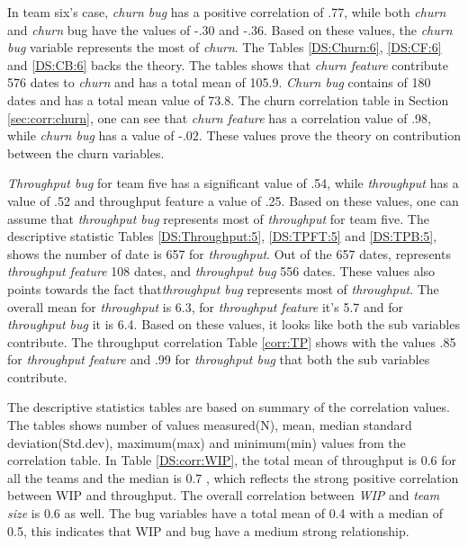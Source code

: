 \documentclass[UKenglish]{ifimaster}  %
\begin{document}
In team six's case, \textit{churn bug} has a positive correlation of .77, while both \textit{churn} and \textit{churn} bug have the values of -.30 and -.36. Based on these values, the \textit{churn bug} variable represents the most of \textit{churn}. The Tables \ref{DS:Churn:6}, \ref{DS:CF:6} and \ref{DS:CB:6} backs the theory. The tables shows that \textit{churn feature} contribute 576 dates to \textit{churn} and has a total mean of 105.9. \textit{Churn bug} contains of 180 dates and has a total mean value of 73.8. The churn correlation table in Section \ref{sec:corr:churn}, one can see that \textit{churn feature} has a correlation value of .98, while \textit{churn bug} has a value of -.02. These values prove the theory on contribution between the churn variables.  

\textit{Throughput bug} for team five has a significant value of .54, while \textit{throughput} has a value of .52 and throughput feature a value of .25. Based on these values, one can assume that \textit{throughput bug} represents most of \textit{throughput} for team five. The descriptive statistic Tables \ref{DS:Throughput:5}, \ref{DS:TPFT:5} and \ref{DS:TPB:5}, shows the number of date is 657 for \textit{throughput}. Out of the 657 dates, represents \textit{throughput feature} 108 dates, and \textit{throughput bug} 556 dates. These values also points towards the fact that\textit{throughput bug} represents most of \textit{throughput}. The overall mean for \textit{throughput} is 6.3, for \textit{throughput feature} it's 5.7 and for \textit{throughput bug} it is 6.4. Based on these values, it looks like both the sub variables contribute. The throughput correlation Table \ref{corr:TP} shows with the values .85 for \textit{throughput feature} and .99 for \textit{throughput bug} that both the sub variables contribute.


The descriptive statistics tables are based on summary of the correlation values. The tables shows number of values measured(N), mean, median standard deviation(Std.dev), maximum(max)  and minimum(min) values from the correlation table.
In Table \ref{DS:corr:WIP}, the total mean of throughput is 0.6 for all the teams and the median is 0.7 , which reflects the strong positive correlation between WIP and throughput.  The overall correlation between \textit{WIP} and \textit{team size}  is 0.6 as well. The bug variables have a total mean of 0.4 with a median of 0.5, this indicates that WIP and bug have a medium strong relationship. 
\end{document}
